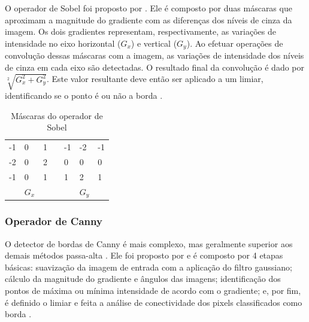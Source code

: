 \documentclass[12pt,oneside,a4paper,english,french,spanish,brazil,]{abntex2}
\begin{document}
O operador de Sobel foi proposto por \citet{sobel:1968}. Ele é composto por duas máscaras que aproximam a magnitude do gradiente com as diferenças dos níveis de cinza da imagem. Os dois gradientes representam, respectivamente, as variações de intensidade no eixo horizontal (\(G_x\)) e vertical (\(G_y\)). Ao efetuar operações de convolução dessas máscaras com a imagem, as variações de intensidade dos níveis de cinza em cada eixo são detectadas. O resultado final da convolução é dado por \(\sqrt[2]{G_x^2 + G_y^2}\). Este valor resultante deve então ser aplicado a um limiar, identificando se o ponto é ou não a borda \cite{pedrini:2008}.

\begin{table}[]
\centering
\caption{Máscaras do operador de Sobel}
\label{tab:Sobel}
\begin{tabular}{lllllll}
\cline{1-3} \cline{5-7}
\multicolumn{1}{|l|}{-1} & \multicolumn{1}{l|}{0} & \multicolumn{1}{l|}{1} & \multicolumn{1}{l|}{} & \multicolumn{1}{l|}{-1} & \multicolumn{1}{l|}{-2} & \multicolumn{1}{l|}{-1} \\ \cline{1-3} \cline{5-7} 
\multicolumn{1}{|l|}{-2} & \multicolumn{1}{l|}{0} & \multicolumn{1}{l|}{2} & \multicolumn{1}{l|}{} & \multicolumn{1}{l|}{0}  & \multicolumn{1}{l|}{0}  & \multicolumn{1}{l|}{0}  \\ \cline{1-3} \cline{5-7} 
\multicolumn{1}{|l|}{-1} & \multicolumn{1}{l|}{0} & \multicolumn{1}{l|}{1} & \multicolumn{1}{l|}{} & \multicolumn{1}{l|}{1}  & \multicolumn{1}{l|}{2}  & \multicolumn{1}{l|}{1}  \\ \cline{1-3} \cline{5-7} 
                         & \(G_x\)                   &                        &                       &                         & \(G_y\)                    &                        
\end{tabular}
\end{table}


\subsubsection{Operador de Canny}

O detector de bordas de Canny é mais complexo, mas geralmente superior aos demais métodos passa-alta \cite{gonzalez:2012}. Ele foi proposto por \citet{canny:1987} e é composto por 4 etapas básicas: suavização da imagem de entrada com a aplicação do filtro gaussiano; cálculo da magnitude do gradiente e ângulos das imagens; identificação dos pontos de máxima ou mínima intensidade de acordo com o gradiente; e, por fim, é definido o limiar e feita a análise de conectividade dos pixels classificados como borda \cite{gonzalez:2012}.
\end{document}
